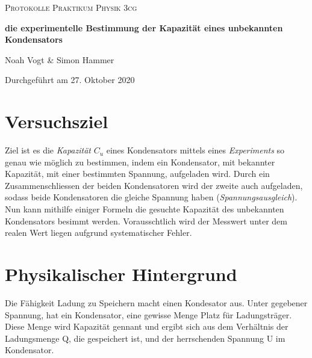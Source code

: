 \documentclass[a4paper,12pt]{article}
\begin{document}
\begin{titlepage}

\vspace*{1cm}
	\centering
	
	{\scshape\Large Protokolle Praktikum Physik 3cg \par}
	\vspace{0.5cm}
	{\huge\bfseries die experimentelle Bestimmung der Kapazität eines unbekannten Kondensators\par}
	\vspace{0.5cm}
	{\Large Noah Vogt \& Simon Hammer\par}
	\vspace{17cm}

	{\large Durchgeführt am 27. Oktober 2020\par}
	
\end{titlepage}

\tableofcontents
\pagebreak

\section{Versuchsziel}
Ziel ist es die \textit{Kapazität} $C_u$ eines Kondensators mittels eines \textit{Experiments} so genau wie möglich zu bestimmen, indem ein Kondensator, mit bekannter Kapazität, mit einer bestimmten Spannung, aufgeladen wird. Durch ein Zusammenschliessen der beiden Kondensatoren wird der zweite auch aufgeladen, sodass beide Kondensatoren die gleiche Spannung haben (\textit{Spannungsausgleich}). Nun kann mithilfe einiger Formeln die gesuchte Kapazität des unbekannten Kondensators besimmt werden. Vorausschtlich wird der Messwert unter dem realen Wert liegen aufgrund systematischer Fehler.

\section{Physikalischer Hintergrund}

Die Fähigkeit Ladung zu Speichern macht einen Kondesator aus. Unter gegebener Spannung, hat ein Kondensator, eine gewisse Menge Platz für Ladungsträger. Diese Menge wird Kapazität gennant und ergibt sich aus dem Verhältnis der Ladungsmenge Q, die gespeichert ist, und der herrschenden Spannung U im Kondensator.


\end{document}
